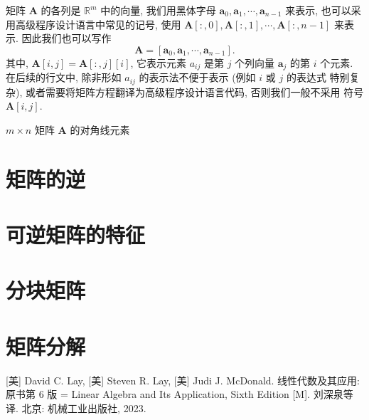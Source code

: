 \documentclass[utf-8, 10pt]{article}
\begin{document}
矩阵 $\boldsymbol{A}$ 的各列是 $\mathbb{R}^m$ 中的向量,
我们用黑体字母 $\boldsymbol{a}_0, 
\boldsymbol{a}_1, \cdots, \boldsymbol{a}_{n-1}$
来表示, 也可以采用高级程序设计语言中常见的记号,
使用 $\boldsymbol{A}[:,0], \boldsymbol{A}[:,1], \cdots, \boldsymbol{A}[:,n-1]$
来表示. 因此我们也可以写作
\[ \boldsymbol{A} = \left[
    \boldsymbol{a}_0,
    \boldsymbol{a}_1, \cdots, \boldsymbol{a}_{n-1}
\right]. \]
其中, $\boldsymbol{A}[i,j] = \boldsymbol{A}[:,j][i]$, 它表示元素 $a_{ij}$ 是第 $j$ 个列向量 
$\boldsymbol{a}_j$ 的第 $i$ 个元素.
在后续的行文中, 除非形如 $a_{ij}$ 的表示法不便于表示 (例如 $i$ 或 $j$ 的表达式
特别复杂), 或者需要将矩阵方程翻译为高级程序设计语言代码, 否则我们一般不采用
符号 $\boldsymbol{A}[i,j]$.

$m \times n$ 矩阵 $\boldsymbol{A}$ 的对角线元素

\clearpage
\section{矩阵的逆}
\section{可逆矩阵的特征}
\section{分块矩阵}
\section{矩阵分解}



\begin{thebibliography}{1}
    [美] David C. Lay, [美] Steven R. Lay, [美] Judi J. McDonald.
    线性代数及其应用: 原书第 6 版 = Linear Algebra and Its Application,
    Sixth Edition [M]. 刘深泉等译. 北京: 机械工业出版社, 2023.
\end{thebibliography}
\end{document}
